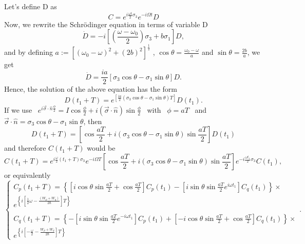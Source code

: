 Let's define D as
\begin{equation}
C= e^{i \frac{\omega t}{2}\sigma_3} e^{-i \Omega t} D
\end{equation}
Now, we rewrite the Schr\"{o}dinger equation in terms of variable D
\begin{equation}
\dot{D}=-i \left[ \left( \frac{\omega - \omega_0}{2}\right) \sigma_3 +b \sigma_1 \right]D ,
\end{equation}
and by defining
$ a:= {\left[{(\omega_0 - \omega)}^2+ {(2b)}^2\right]}^\frac{1}{2}$ ,
$\cos \theta = \frac{\omega_0 - \omega}{a}$ and
$\sin \theta=\frac{2b}{a}$, we get
\begin{equation}
\dot{D}=\frac{i a}{2}\left[ \sigma_3 \cos \theta - \sigma_1 \sin \theta \right] D .
\end{equation}
Hence, the solution of the above equation has the form
\begin{equation}
D(t_1+T)= e^{\left[\frac{i a}{2}
\left( \sigma_3 \cos \theta
-\sigma_1\sin \theta 
\right) T 
\right]
}D(t_1) .
\end{equation}
If we use \,
$ e^{i \vec{\sigma}\cdot\hat{n}\frac{\phi}{2}}= I \cos \frac{\phi}{2}+
i (\vec{\sigma}\cdot\hat{n})\sin \frac{\phi}{2}$ \, with \, $ \phi=aT$
\, and \,
$\vec{\sigma}\cdot\hat{n}=\sigma_3 \cos \theta -\sigma_1 \sin \theta$,
then
\begin{equation}
D(t_1+T)= \left[\cos \frac{aT}{2}+i(\sigma_3 \cos \theta - \sigma_1 \sin \theta ) \sin \frac{aT}{2}\right] D(t_1)
\end{equation}
and therefore $C(t_1+T)$ would be
\begin{equation}
C(t_1+T)= e^{i\frac{\omega}{2}(t_1+T)\sigma_3} e^{-i \Omega T} \left[\cos \frac{aT}{2}+i(\sigma_3 \cos \theta - \sigma_1 \sin \theta ) \sin \frac{aT}{2}\right] e^{-i \frac{\omega t_1}{2}\sigma_3} C(t_1),
\end{equation}
or equivalently
\begin{equation}
\left\lbrace
\begin{array}{c}
  C_p(t_1+T)= \left\lbrace \left[
  i \cos \theta \sin \frac{aT}{2}+\cos \frac{aT}{2} \right] C_p(t_1)-
  \left[i \sin \theta \sin \frac{aT}{2} e^{i \omega t_1} \right]C_q(t_1)\right\rbrace \times \\
  e^{\left\lbrace i\left[\frac{1}{2}\omega - \frac{(W_p + W_q)}{2\hbar}\right] T\right\rbrace}
  \\
  \, \,
  \\
  C_q(t_1+T)=\left\lbrace - \left[ i \sin \theta \sin \frac{aT}{2} e^{-i \omega t_1}\right]C_p(t_1) +
  \left[-i \cos \theta \sin \frac{aT}{2}+ \cos \frac{aT}{2}\right] C_q(t_1)\right\rbrace \times
  \\
  e^{\left\lbrace i \left[ -\frac{\omega}{2}- \frac{W_p+W_q}{2\hbar} \right] T \right\rbrace}
\end{array}
\right. .
\end{equation} 
